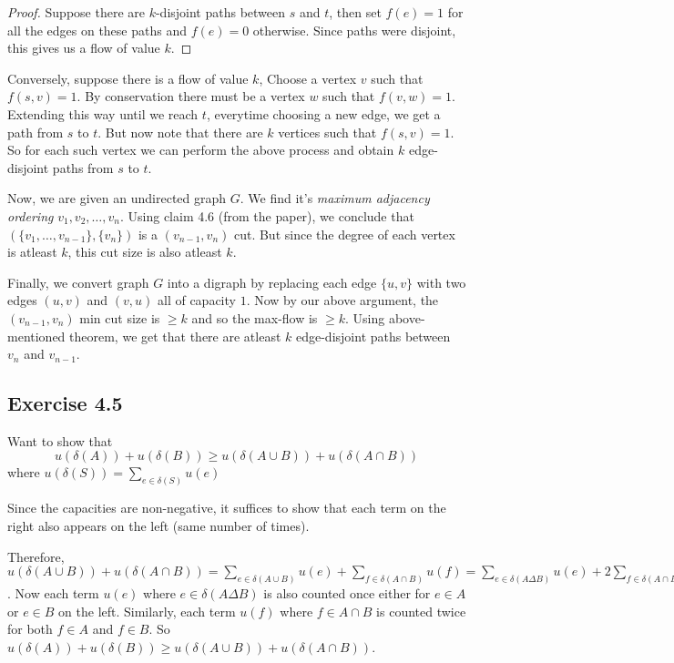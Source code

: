 \documentclass[12pt]{article}
\begin{document}
\begin{proof}
Suppose there are $k$-disjoint paths between $s$ and $t$, then set $f(e)=1$ for all the edges on these paths and $f(e)=0$ otherwise. Since paths were disjoint, this gives us a flow of value $k$.
\end{proof}

Conversely, suppose there is a flow of value $k$, Choose a vertex $v$ such that $f(s,v)=1$. By conservation there must be a vertex $w$ such that $f(v,w)=1$. Extending this way until we reach $t$, everytime choosing a new edge, we get a path from $s$ to $t$. But now note that there are $k$ vertices such that $f(s,v)=1$. So for each such vertex we can perform the above process and obtain $k$ edge-disjoint paths from $s$ to $t$.
\newline

Now, we are given an undirected graph $G$. We find it's \textsl{maximum adjacency ordering} $v_1, v_2, \ldots, v_n$. Using claim 4.6 (from the paper), we conclude that $(\{v_1, \ldots , v_{n-1}\}, \{v_n\})$ is a $(v_{n-1}, v_n)$ cut. But since the degree of each vertex is atleast $k$, this cut size is also atleast $k$.

Finally, we convert graph $G$ into a digraph by replacing each edge $\{u,v\}$ with two edges $(u,v)$ and $(v,u)$ all of capacity $1$. Now by our above argument, the $(v_{n-1}, v_n)$ min cut size is $\geq k$ and so the max-flow is $\geq k$. Using above-mentioned theorem, we get that there are atleast $k$ edge-disjoint paths between $v_n$ and $v_{n-1}$.


\subsection*{Exercise 4.5}

Want to show that
$$u(\delta(A)) + u(\delta(B)) \geq u(\delta(A \cup B)) + u(\delta(A \cap B))$$
where $u(\delta(S)) = \sum_{e \in \delta(S)} u(e)$

Since the capacities are non-negative, it suffices to show that each term on the right also appears on the left (same number of times).

Therefore, $u(\delta(A \cup B)) + u(\delta(A \cap B)) = \sum_{e \in \delta(A \cup B)} u(e) + \sum_{f \in \delta(A \cap B)} u(f) = \sum_{e \in \delta(A \Delta B)} u(e) + 2\sum_{f \in \delta(A \cap B)} u(f)$. Now each term $u(e)$ where $e \in \delta(A \Delta B)$ is also counted once either for $e \in A$ or $e \in B$ on the left. Similarly, each term $u(f)$ where $f \in A \cap B$ is counted twice for both $f \in A$ and $f \in B$. So $u(\delta(A)) + u(\delta(B)) \geq u(\delta(A \cup B)) + u(\delta(A \cap B))$.
\end{document}
